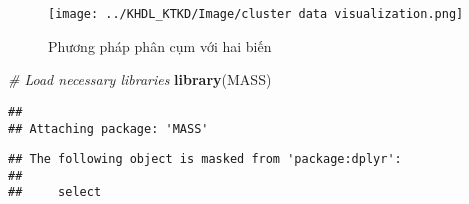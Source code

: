\documentclass[
]{article}
\newenvironment{Shaded}{\begin{snugshade}}{\end{snugshade}}
\newcommand{\CommentTok}[1]{\textcolor[rgb]{0.56,0.35,0.01}{\textit{#1}}}
\newcommand{\FunctionTok}[1]{\textcolor[rgb]{0.13,0.29,0.53}{\textbf{#1}}}
\newcommand{\NormalTok}[1]{#1}
\begin{document}
\begin{figure}
\centering
\texttt{[image: ../KHDL\_KTKD/Image/cluster data visualization.png]}
\caption{Phương pháp phân cụm với hai biến}
\end{figure}

\begin{Shaded}
\begin{Highlighting}[]
\CommentTok{\# Load necessary libraries}
\FunctionTok{library}\NormalTok{(MASS)}
\end{Highlighting}
\end{Shaded}

\begin{verbatim}
## 
## Attaching package: 'MASS'
\end{verbatim}

\begin{verbatim}
## The following object is masked from 'package:dplyr':
## 
##     select
\end{verbatim}
\end{document}
